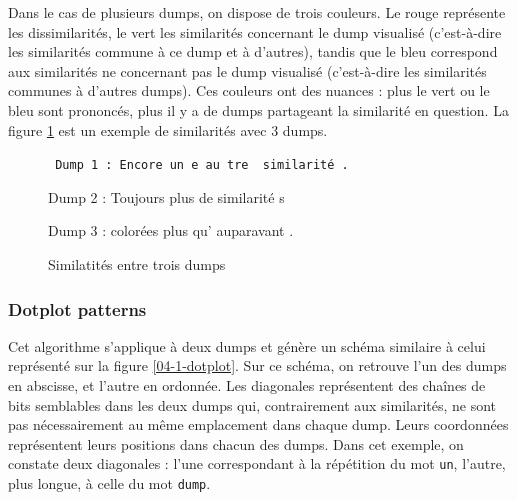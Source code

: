 Dans le cas de plusieurs dumps, on dispose de trois couleurs. Le rouge représente les dissimilarités, le vert les similarités concernant le dump visualisé (c'est-à-dire les similarités commune à ce dump et à d'autres), tandis que le bleu correspond aux similarités ne concernant pas le dump visualisé (c'est-à-dire les similarités communes à d'autres dumps).
Ces couleurs ont des nuances : plus le vert ou le bleu sont prononcés, plus il y a de dumps partageant la similarité en question. La figure \ref{04-1-sim_mult} est un exemple de similarités avec 3 dumps.

\begin{figure}[!h]
  \begin{center}
  {\tt
  {Dump 1 : \color{dissimColor} Encore un}{\color{otherSimColor} e au}{\color{dissimColor} tre }{\color{simColor} similarité}{\color{dissimColor} .}

  {Dump 2 : \color{dissimColor} Toujours }{\color{simColor} plus }{\color{dissimColor} de }{\color{simColor} similarité}{\color{dissimColor} s}

  {Dump 3 : \color{dissimColor} colorées }{\color{simColor} plus }{\color{dissimColor} qu'}{\color{otherSimColor} auparavant}{\color{dissimColor} .}
  }
  \end{center}
  \caption{Similatités entre trois dumps}
  \label{04-1-sim_mult}
\end{figure}

\subsubsection{Dotplot patterns \cite {ref-dotplot}} \label{04-dotplot}

Cet algorithme s'applique à deux dumps et génère un schéma similaire à celui représenté sur la figure \ref{04-1-dotplot}.
Sur ce schéma, on retrouve l'un des dumps en abscisse, et l'autre en ordonnée. Les diagonales représentent des chaînes de bits semblables dans les deux dumps qui, contrairement aux similarités, ne sont pas nécessairement au même emplacement dans chaque dump. Leurs coordonnées représentent leurs positions dans chacun des dumps.
Dans cet exemple, on constate deux diagonales : l'une correspondant à la répétition du mot \texttt{un}, l'autre, plus longue, à celle du mot \texttt{dump}.

